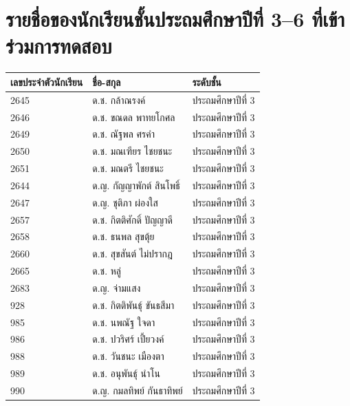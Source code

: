 \section{รายชื่อของนักเรียนชั้นประถมศึกษาปีที่ 3--6 ที่เข้าร่วมการทดสอบ}
\begin{table}[h]
    \begin{center}
        \begin{tabular}{ |p{3cm}|p{4cm}|p{3cm}| }
            \hline
            เลขประจำตัวนักเรียน & ชื่อ-สกุล & ระดับชั้น\\
            \hline
            2645 & ด.ช. กล้าณรงค์ & ประถมศึกษาปีที่ 3\\
            \hline
            2646 & ด.ช. ขณดล พาทยโกศล & ประถมศึกษาปีที่ 3\\
            \hline
            2649 & ด.ช. ณัฐพล ศรคำ & ประถมศึกษาปีที่ 3\\
            \hline
            2650 & ด.ช. มณเฑียร ไชยชนะ & ประถมศึกษาปีที่ 3\\
            \hline
            2651 & ด.ช. มณตรี ไชยชนะ & ประถมศึกษาปีที่ 3\\
            \hline
            2644 & ด.ญ. กัญญาพักต์ สินโพธิ์ & ประถมศึกษาปีที่ 3\\
            \hline
            2647 & ด.ญ. ชุติภา ผ่องใส & ประถมศึกษาปีที่ 3\\
            \hline
            2657 & ด.ช. กิตติศักดิ์ ปัญญาดี & ประถมศึกษาปีที่ 3\\
            \hline
            2658 & ด.ช. ธนพล สุขตุ้ย & ประถมศึกษาปีที่ 3\\
            \hline
            2660 & ด.ช. สุขสันต์ ไม่ปรากฎ & ประถมศึกษาปีที่ 3\\
            \hline
            2665 & ด.ช. หลู่ & ประถมศึกษาปีที่ 3\\
            \hline
            2683 & ด.ญ. จ่ามแสง & ประถมศึกษาปีที่ 3\\
            \hline
            928 & ด.ช. กิตติพันธุ์ ขันธสีมา & ประถมศึกษาปีที่ 3\\
            \hline
            985 & ด.ช. นพณัฐ ใจดา & ประถมศึกษาปีที่ 3\\
            \hline
            986 & ด.ช. ปวริศร์ เปี้ยวงค์ & ประถมศึกษาปีที่ 3\\
            \hline
            988 & ด.ช. วันชนะ เมืองตา & ประถมศึกษาปีที่ 3\\
            \hline
            989 & ด.ช. อนุพันธุ์ นำโน & ประถมศึกษาปีที่ 3\\
            \hline
            990 & ด.ญ. กมลทิพย์ กันธาทิพย์ & ประถมศึกษาปีที่ 3\\

\end{tabular}
\end{center}
\end{table}
